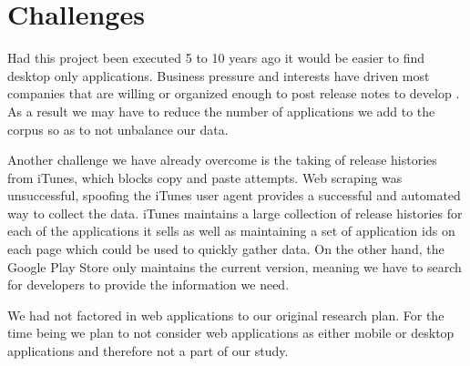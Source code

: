 \documentclass{acm_proc_article-sp}
\begin{document}
\begin{center}

\label{tab:features}
\end{center}

\begin{center}

\label{tab:sumfeatures}
\end{center}


\begin{center}

\label{tab:nonFunc}
\end{center}

\begin{center}

\label{tab:sumNonFunc}
\end{center}

\begin{center}

\label{tab:mobileModel}
\end{center}

\begin{center}

\label{tab:desktopModel}
\end{center}

\begin{center}

\label{tab:sibModel}
\end{center}

\section{Challenges}
Had this project been executed 5 to 10 years ago it would be easier to find desktop only applications. 
Business pressure and interests have driven most companies that are willing or organized enough to post release notes to develop \sibs. 
As a result we may have to reduce the number of applications we add to the corpus so as to not unbalance our data.

Another challenge we have already overcome is the taking of release histories from iTunes, which blocks copy and paste attempts. 
Web scraping was unsuccessful, spoofing the iTunes user agent provides a successful and automated way to collect the data.
iTunes maintains a large collection of release histories for each of the applications it sells as well as maintaining a set of application ids on each page which could be used to quickly gather data.
On the other hand, the Google Play Store only maintains the current version, meaning we have to search for developers to provide the information we need.

We had not factored in web applications to our original research plan. For the time being we plan to not consider web applications as either mobile or desktop applications and therefore not a part of our study.
\end{document}
